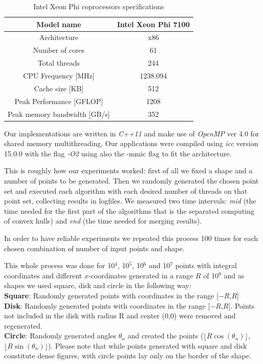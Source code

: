 \documentclass[letterpaper]{article}
\theoremstyle{definition}
\begin{document}
\begin{table}[!ht]
\begin{tabular}{|c|c|}
\hline Model name				& Intel Xeon Phi 7100\\
\hline Architecture				& x86\\
\hline Number of cores			& 61\\
\hline Total threads				& 244\\
\hline CPU Frequency [MHz]		& 1238.094\\
\hline Cache size [KB]			& 512\\
\hline Peak Performance [GFLOP]	& 1208\\
\hline Peak memory bandwidth [GB/s]		& 352\\
\hline
\end{tabular}
\caption{Intel Xeon Phi coprocessors specifications \cite{XeonPhi}}
\end{table}

Our implementations are written in \textit{C++11} and make use of \textit{OpenMP} ver 4.0 \cite{OpenMP} for shared memory multithreading.
Our applications were compiled using \textit{icc} version 15.0.0 with the flag \textit{-O2} using also the -mmic flag to fit the architecture.

This is roughly how our experiments worked:
first of all we fixed a shape and a number of points to be generated. Then we randomly generated the chosen point set and executed each algorithm with each desired number of threads on that point set, collecting results in logfiles. We measured two time intervals: \textit{mid} (the time needed for the first part of the algorithms that is the separated computing of convex hulls) and \textit{end} (the time needed for merging results).

In order to have reliable experiments we repeated this process 100 times for each chosen combination of number of input points and shape.

This whole process was done for 10$^4$, 10$^5$, 10$^6$ and 10$^7$ points with integral coordinates and different $x$-coordinates generated in a range $R$ of 10$^9$ and as shapes we used square, disk and circle in the following way:\\
{\bf Square}: Randomly generated points with coordinates in the range [$-R$,$R$]\\
{\bf Disk}: Randomly generated points with coordinates in the range [$-R$,$R$]. Points not included in the disk with radius R and center (0,0) were removed and regenerated.\\
{\bf Circle}: Randomly generated angles $\theta_n$ and created the points ($\lfloor R \cos(\theta_n)\rfloor$, $\lfloor R \sin(\theta_n)\rfloor$). Please note that while points generated with square and disk constitute dense figures, with circle points lay only on the border of the shape.
\end{document}
